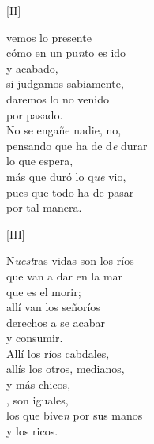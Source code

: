 \documentclass[11pt,a4paper,twoside]{article}
\newcommand{\comillas}[1]{«#1»}
\begin{document}
{{\begin{center}
		[II]
\end{center}}
\pstart
{} vemos lo presente\\
cómo en un pu\textit{n}to  es ido\\
y acabado,\\
si judgamos sabiamente,\\
daremos lo no venido\\
por pasado.\\
No se engañe nadie, no,\\
pensando que ha de d\textit{e} durar\\ 
lo que espera,\\
más que duró lo q\textit{ue} vio,\\
pues que todo ha de pasar\\
por tal manera.
\pend

\begin{center}
		[III]\footnoteA{[III] \comillas{conpara} \textit{LB3}.}
\end{center}
\pstart
N\textit{uest}ras vidas son los ríos\\
que van a dar en la mar\\
que es el morir;\\
allí van los señoríos\\
derechos a se acabar\\
y consumir.\\
Allí los ríos cabdales,\\
allís los otros, medianos,\\
y más chicos,\\
, son iguales,\\
los que bive\textit{n} por sus manos\\
y los ricos.
\pend

}
\end{document}
